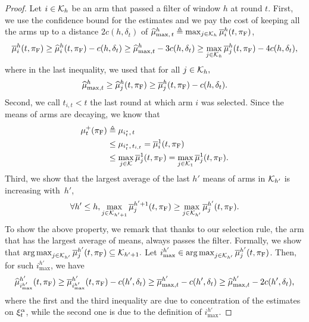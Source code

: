 \begin{proof}
Let $i \in \mathcal{K}_h$ be an arm that passed a filter of window $h$ at round $t$.
First, we use the confidence bound for the estimates and we pay the cost of keeping all the arms up to a distance $2c(h,  \delta_t)$ of $\widehat{\mu}^{h}_{\max,\, t} \triangleq \max_{j \in \mathcal{K}_h} \overline{\mu}_i^h(t,\pi_{\rm F})$,
\begin{equation}
\label{1}
\overline{\mu}_i^h(t,\pi_{\rm F})\geq \widehat{\mu}_i^h(t,\pi_{\rm F})- c(h,  \delta_t) \geq \widehat{\mu}^h_{\max,t} - 3c(h, \delta_t)
\geq \max_{j \in \mathcal{K}_h}\overline{\mu}_j^h(t,\pi_{\rm F})  - 4 c(h, \delta_t),
\end{equation}
where in the last inequality, we used that for all $j \in \mathcal{K}_h,$ \[\widehat{\mu}^{h}_{\max,t} \geq  \widehat{\mu}_j^h(t,\pi_{\rm F})  \geq \overline{\mu}_j^h(t,\pi_{\rm F})  - c(h, \delta_t).\]
Second, we call $t_{i,t} < t$ the last round at which arm $i$ was selected. Since the means of arms are decaying, we know that 
\begin{align}
\label{2}
 \mu^+_t(\pi_{\rm F}) &\triangleq \mu_{i^\star_t, \, t} \nonumber\\
 &\leq  \mu_{i^\star_t, \, t_{i,t}} =  \overline{\mu}_i^1(t,\pi_{\rm F})  \nonumber\\
 &\leq \max_{j \in \mathcal{K}}\overline{\mu}_j^1(t,\pi_{\rm F})  = \max_{j \in \mathcal{K}_1} \overline{\mu}_j^1(t,\pi_{\rm F}).
\end{align}
Third, we show that the largest average of the last $h'$ means of arms in $\mathcal{K}_{h'}$ is increasing with~$h'$,
\begin{equation*}
\forall  h' \leq h ,  \max_{j \in \mathcal{K}_{h'+1}}\overline{\mu}_j^{h'+1}(t,\pi_{\rm F})   \geq \max_{j \in \mathcal{K}_{h'}}\overline{\mu}_j^{h'}(t,\pi_{\rm F}). 
\end{equation*}
To show the above property, we remark that thanks to our selection rule, the arm that has the largest average of means, always passes the filter. Formally, we show that $\operatorname*{arg\,max}_{j \in \mathcal{K}_{h'}}\overline{\mu}_j^{h'}(t,\pi_{\rm F}) \subseteq \mathcal{K}_{h'+1}.$ 
Let $i^{h'}_{\max} \in \operatorname*{arg\,max}_{j \in \mathcal{K}_{h'}}\overline{\mu}_j^{h'}(t,\pi_{\rm F})$. Then, for such $i^{h'}_{\max}$, we have
\begin{equation*}
\widehat{\mu}_{i^{h'}_{\max}}^{h'}(t,\pi_{\rm F}) \geq \overline{\mu}_{i^{h'}_{\max}}^{h'}(t,\pi_{\rm F}) - c(h', \delta_t) 
\geq \overline{\mu}^{h'}_{\max,t} - c(h', \delta_t) \geq \widehat{\mu}^{h'}_{\max,t}- 2c(h', \delta_t),
\end{equation*}
where the first and the third inequality are due to concentration of the estimates on $\xi^\alpha_t$, while the second one is due to the definition of $i^{h'}_{\max}$. 


\end{proof}
